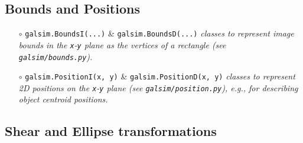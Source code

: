 \documentclass[preprint,11pt]{aastex}
\begin{document}
\subsection{Bounds and Positions}\label{sect:bounds}

\begin{itemize}

\item[$\circ$] \texttt{galsim.BoundsI(...)} \& \texttt{galsim.BoundsD(...)} \newline 
\emph{classes to represent image bounds in the \texttt{x}-\texttt{y}
    plane as the vertices of a rectangle (see \texttt{galsim/bounds.py}).}

\item[$\circ$] \texttt{galsim.PositionI(x, y)} \&
  \texttt{galsim.PositionD(x, y)} \newline
  \emph{classes to represent 2D positions on the \texttt{x}-\texttt{y}
    plane (see \texttt{galsim/position.py}), e.g., for describing object centroid positions.}

\end{itemize}

\subsection{Shear and Ellipse transformations}\label{sect:shears}
\end{document}
